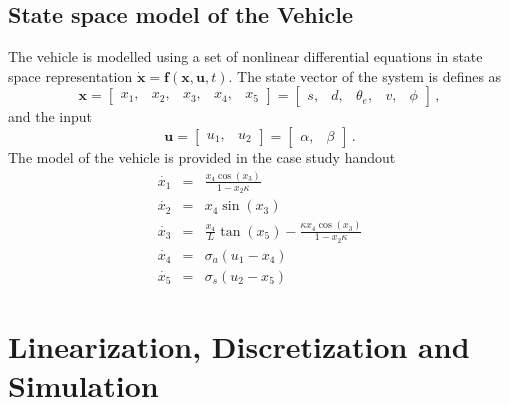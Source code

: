 \documentclass{scrartcl}
\begin{document}
\subsection*{State space model of the Vehicle}
The vehicle is modelled using a set of nonlinear differential equations in state space representation $\mathbf{\dot{x}} = \mathbf{f}(\mathbf{x}, \mathbf{u}, t)$.
The state vector of the system is defines as
\begin{equation}
	\mathbf{x} = \begin{bmatrix}
		x_1, &x_2, &x_3, &x_4, &x_5
	\end{bmatrix} = \begin{bmatrix}
		s, &d, &\theta_e, &v, &\phi
	\end{bmatrix}\, ,
\end{equation}
and the input
\begin{equation}
	\mathbf{u} = \begin{bmatrix}
		u_1, &u_2	
	\end{bmatrix} = \begin{bmatrix}
		\alpha, &\beta
	\end{bmatrix}\, .
\end{equation}
The model of the vehicle is provided in the case study handout
\begin{eqnarray}
	\dot{x_1} &=& \frac{x_4 \cos(x_3)}{1 - x_2\kappa}\\
	\dot{x_2} &=& x_4 \sin(x_3)\\
	\dot{x_3} &=& \frac{x_4}{L}\tan(x_5) - \frac{\kappa x_4 \cos(x_3)}{1 - x_2 \kappa}\\
	\dot{x_4} &=& \sigma_a (u_1 - x_4)\\
	\dot{x_5} &=& \sigma_s (u_2 - x_5)
\end{eqnarray}
\section{Linearization, Discretization and Simulation}
\end{document}
